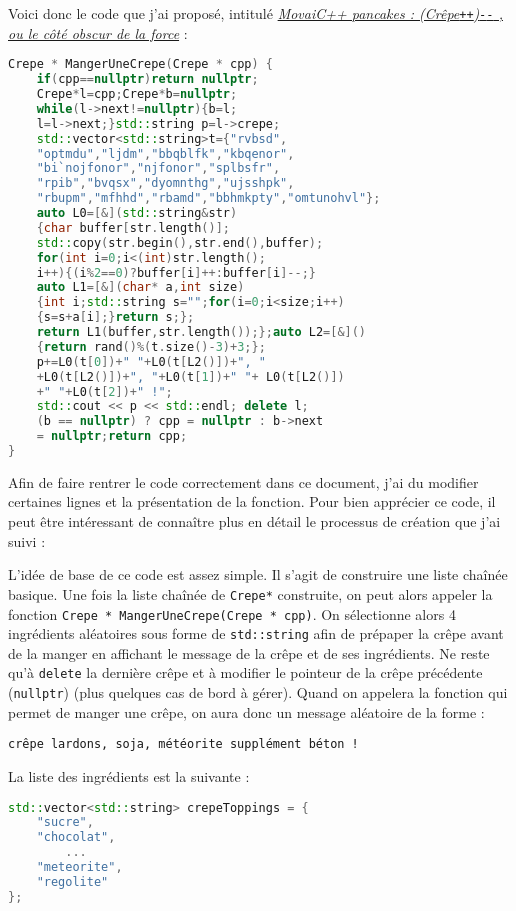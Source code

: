 \documentclass[12pt]{article} %
\newcommand{\doublep}{\texttt{++}} %
\newcommand{\doublem}{\texttt{-}\texttt{-} \space} %
\begin{document}
\newpage
Voici donc le code que j'ai proposé, intitulé \textit{\href{https://github.com/CoddityTeam/movaicode/issues/183}{MovaiC++ pancakes : (Crêpe\doublep)\doublem , ou le côté obscur de la force}} :
\begin{lstlisting}[language=C++, caption={(Crêpe\doublep)\doublem}, label={code:crepepp}]
Crepe * MangerUneCrepe(Crepe * cpp) {
    if(cpp==nullptr)return nullptr;
    Crepe*l=cpp;Crepe*b=nullptr;
    while(l->next!=nullptr){b=l;
    l=l->next;}std::string p=l->crepe;
    std::vector<std::string>t={"rvbsd",
    "optmdu","ljdm","bbqblfk","kbqenor",
    "bi`nojfonor","njfonor","splbsfr",
    "rpib","bvqsx","dyomnthg","ujsshpk",
    "rbupm","mfhhd","rbamd","bbhmkpty","omtunohvl"};
    auto L0=[&](std::string&str)
    {char buffer[str.length()];
    std::copy(str.begin(),str.end(),buffer);
    for(int i=0;i<(int)str.length();
    i++){(i%2==0)?buffer[i]++:buffer[i]--;}
    auto L1=[&](char* a,int size)
    {int i;std::string s="";for(i=0;i<size;i++)
    {s=s+a[i];}return s;};
    return L1(buffer,str.length());};auto L2=[&]()
    {return rand()%(t.size()-3)+3;};
    p+=L0(t[0])+" "+L0(t[L2()])+", "
    +L0(t[L2()])+", "+L0(t[1])+" "+ L0(t[L2()])
    +" "+L0(t[2])+" !";
    std::cout << p << std::endl; delete l;
    (b == nullptr) ? cpp = nullptr : b->next 
    = nullptr;return cpp;
}
\end{lstlisting}
Afin de faire rentrer le code correctement dans ce document, j'ai du modifier certaines lignes et la présentation de la fonction. Pour bien apprécier ce code, il peut être intéressant de connaître plus en détail le processus de création que j'ai suivi :

L'idée de base de ce code est assez simple. Il s'agit de construire une liste chaînée basique. Une fois la liste chaînée de \verb|Crepe*| construite, on peut alors appeler la fonction \verb|Crepe * MangerUneCrepe(Crepe * cpp)|. On sélectionne alors 4 ingrédients aléatoires sous forme de \verb|std::string| afin de prépaper la crêpe avant de la manger en affichant le message de la crêpe et de ses ingrédients. Ne reste qu'à \verb|delete| la dernière crêpe et à modifier le pointeur de la crêpe précédente (\verb|nullptr|) (plus quelques cas de bord à gérer). Quand on appelera la fonction qui permet de manger une crêpe, on aura donc un message aléatoire de la forme :

\verb|crêpe lardons, soja, météorite supplément béton !|

La liste des ingrédients est la suivante :
\begin{lstlisting}[language=C++]
std::vector<std::string> crepeToppings = {
    "sucre",
    "chocolat",
        ...
    "meteorite",
    "regolite"
};
\end{lstlisting}
\end{document}

